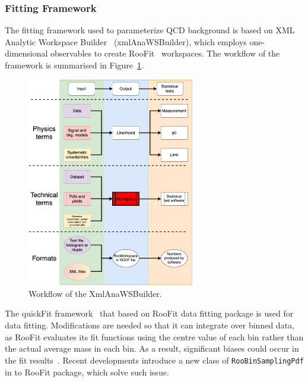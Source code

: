 \label{sec:statistical_framework}

\subsubsection{Fitting Framework}

The fitting framework used to parameterize QCD background is based on XML Analytic Workspace Builder~\cite{xmlAnaWSBuilder} (xmlAnaWSBuilder), which employs one-dimensional 
observables to create RooFit~\cite{RooFit} workspaces. The workflow of the framework is summarised in Figure~\ref{fig:xmlAnaWSBuilderworkflow}.

\begin{figure}[htb]
 \centering
\includegraphics[width=0.65\textwidth]{fig/06-StatisticalFramework/xmlAnaWSBuilder_workflow}
\caption{Workflow of the XmlAnaWSBuilder.  \label{fig:xmlAnaWSBuilderworkflow}}
\end{figure}

The quickFit framework~\cite{quickFit} that based on RooFit data fitting package is used for data fitting. Modifications are needed so that it can integrate over binned data, as RooFit evaluates its fit functions using the centre value of each bin rather than the actual average mass in each bin. As a result, significant biases could occur in the  fit results~\cite{gligorov2021avoiding}. Recent developments introduce a new class of \texttt{RooBinSamplingPdf} in to RooFit package, which solve such issue.


